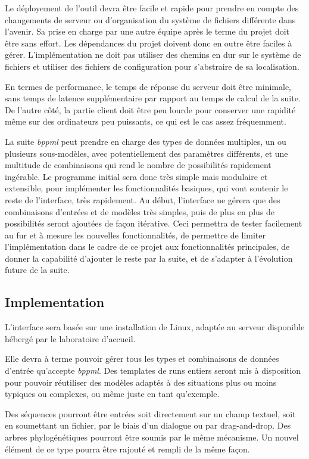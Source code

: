 Le déployement de l'outil devra être facile et rapide
pour prendre en compte des changements de serveur
ou d'organisation du système de fichiers différente dans l'avenir.
Sa prise en charge par une autre équipe après le terme du projet
doit être sans effort.
Les dépendances du projet doivent donc en outre
être faciles à gérer.
L'implémentation ne doit pas utiliser des chemins en dur sur le système de fichiers
et utiliser des fichiers de configuration
pour s'abstraire de sa localisation.

En termes de performance,
le temps de réponse du serveur doit être minimale,
sans temps de latence supplémentaire par rapport au temps de calcul de la suite.
De l'autre côté, la partie client doit être peu lourde
pour conserver une rapidité même sur des ordinateurs peu puissants,
ce qui est le cas assez fréquemment.

La suite \textit{bppml} peut prendre en charge
des types de données multiples, un ou plusieurs sous-modèles,
avec potentiellement des paramètres différents,
et une multitude de combinaisons
qui rend le nombre de possibilités rapidement ingérable.
Le programme initial sera donc très simple mais modulaire et extensible,
pour implémenter les fonctionnalités basiques,
qui vont soutenir le reste de l'interface,
très rapidement.
Au début, l'interface ne gérera que
des combinaisons d'entrées et de modèles très simples,
puis de plus en plus de possibilités seront ajoutées de façon itérative.
Ceci permettra
de tester facilement au fur et à mesure les nouvelles fonctionnalités,
de permettre de limiter l'implémentation dans le cadre de ce projet
aux fonctionnalités principales,
de donner la capabilité d'ajouter le reste par la suite,
et de s'adapter à l'évolution future de la suite.


\subsection{Implementation}

L'interface sera basée sur une installation de Linux,
adaptée au serveur disponible hébergé par le laboratoire d'accueil.

Elle devra à terme pouvoir gérer tous les types
et combinaisons de données d'entrée qu'accepte \textit{bppml}.
Des templates de runs entiers seront mis à disposition
pour pouvoir réutiliser des modèles adaptés à des situations
plus ou moins typiques ou complexes,
ou même juste en tant qu'exemple.

Des séquences pourront être entrées soit directement sur un champ textuel,
soit en soumettant un fichier,
par le biais d'un dialogue ou par drag-and-drop.
Des arbres phylogénétiques pourront être soumis par le même mécanisme.
Un nouvel élément de ce type pourra être rajouté et rempli de la même façon.

